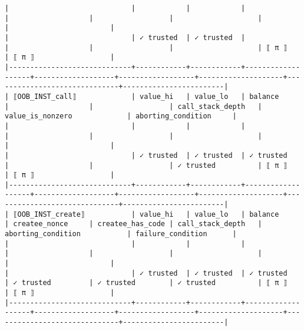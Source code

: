 \documentclass[varwidth=\maxdimen,margin=0.5cm,multi={verbatim}]{standalone}
\begin{document}
\begin{verbatim}
|                             |            |            |                   |                   |                  |                    |                              |                        |
|                             | ✓ trusted  | ✓ trusted  |                   |                   |                  |                    | ⟦ π ⟧                        | ⟦ π ⟧                  |
|-----------------------------+------------+------------+-------------------+-------------------+------------------+--------------------+------------------------------+------------------------|
| ⟦OOB_INST_call⟧             | value_hi   | value_lo   | balance           |                   |                  | call_stack_depth   | value_is_nonzero             | aborting_condition     |
|                             |            |            |                   |                   |                  |                    |                              |                        |
|                             | ✓ trusted  | ✓ trusted  | ✓ trusted         |                   |                  | ✓ trusted          | ⟦ π ⟧                        | ⟦ π ⟧                  |
|-----------------------------+------------+------------+-------------------+-------------------+------------------+--------------------+------------------------------+------------------------|
| ⟦OOB_INST_create⟧           | value_hi   | value_lo   | balance           | createe_nonce     | createe_has_code | call_stack_depth   | aborting_condition           | failure_condition      |
|                             |            |            |                   |                   |                  |                    |                              |                        |
|                             | ✓ trusted  | ✓ trusted  | ✓ trusted         | ✓ trusted         | ✓ trusted        | ✓ trusted          | ⟦ π ⟧                        | ⟦ π ⟧                  |
|-----------------------------+------------+------------+-------------------+-------------------+------------------+--------------------+------------------------------+------------------------|

\end{verbatim}
\end{document}
